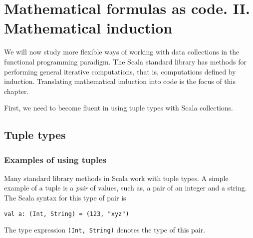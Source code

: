 
\chapter{Mathematical formulas as code. II. Mathematical induction\label{chap:2-Mathematical-induction}}

We will now study more flexible ways of working with data collections
in the functional programming paradigm. The Scala standard library
has methods for performing general iterative computations, that is,
computations defined by induction. Translating mathematical induction
into code is the focus of this chapter.

First, we need to become fluent in using tuple types with Scala collections.

\section{Tuple types}

\subsection{Examples of using tuples}

Many standard library methods in Scala work with tuple
types. A simple example of a tuple is a \emph{pair} of values, \textendash{}
such as, a pair of an integer and a string. The Scala syntax for this
type of pair is
\begin{lstlisting}
val a: (Int, String) = (123, "xyz")
\end{lstlisting}
The type expression \lstinline!(Int, String)! denotes the type of
this pair.

